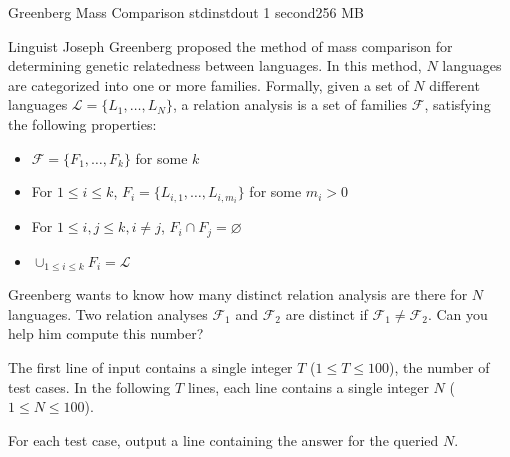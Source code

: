 \begin{problem}{Greenberg Mass Comparison}
{stdin}{stdout}
{1 second}{256 MB}{}

Linguist Joseph Greenberg proposed the method of mass comparison for determining genetic relatedness between languages. In this method, $N$ languages are categorized into one or more families. Formally, given a set of $N$ different languages $\mathcal{L} = \{L_1, \hdots, L_N\}$, a relation analysis is a set of families $\mathcal{F}$, satisfying the following properties:
\begin{itemize}
\item $\mathcal{F} = \{F_1, \hdots, F_k\}$ for some $k$
\item For $1 \le i \le k$, $F_i = \{L_{i,1}, \hdots, L_{i,m_i}\}$ for some $m_i > 0$
\item For $1 \le i,j \le k, i \ne j$, $F_i \cap F_j = \varnothing$
\item $\cup_{1 \le i \le k}{F_i} = \mathcal{L}$
\end{itemize}

Greenberg wants to know how many distinct relation analysis are there for $N$ languages. Two relation analyses $\mathcal{F}_1$ and $\mathcal{F}_2$ are distinct if $\mathcal{F}_1 \ne \mathcal{F}_2$. Can you help him compute this number?

\InputFile

The first line of input contains a single integer $T$ ($1 \le T \le 100$), the number of test cases.
In the following $T$ lines, each line contains a single integer $N$ ($1 \le N \le 100$).

\OutputFile

For each test case, output a line containing the answer for the queried $N$.

\Examples

\begin{example}
%
\end{example}

\end{problem}
